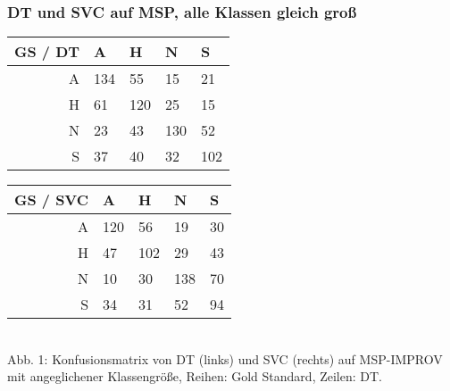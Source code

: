 \documentclass{article} %
\begin{document}
\subsubsection{DT und SVC auf MSP, alle Klassen gleich groß}

\begin{tabular}{|r|llll|}
\hline
GS / DT & A & H & N & S \\
\hline
A & 134 & 55 & 15 & 21 \\
H & 61 & 120 & 25 & 15 \\
N & 23 & 43 & 130 & 52 \\
S & 37 & 40 & 32 & 102 \\
\hline
\end{tabular}
\begin{tabular}{|r|llll|}
\hline
GS / SVC & A & H & N & S \\
\hline
A & 120 & 56 & 19 & 30 \\
H & 47 & 102 & 29 & 43 \\
N & 10 & 30 & 138 & 70 \\
S & 34 & 31 & 52 & 94 \\
\hline
\end{tabular} \\

Abb. 1: Konfusionsmatrix von DT (links) und SVC (rechts) auf MSP-IMPROV mit angeglichener Klassengröße, Reihen: Gold Standard, Zeilen: DT. \\
\end{document}
